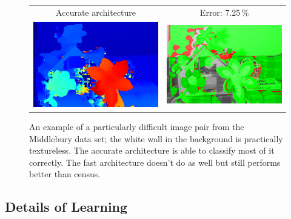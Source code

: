 \documentclass[twoside,11pt]{article}
\begin{document}
\begin{figure}[p]
\begin{center}
\begin{tabular}{cc}
Accurate architecture &
Error: 7.25\,\% \\
\includegraphics[scale=0.5]{img/mb_slow_7_2_pred_.png} &
\includegraphics[scale=0.5]{img/mb_slow_7_2_err_.png}\\
\end{tabular}

\caption{An example of a particularly difficult image pair from the Middlebury
data set; the white wall in the background is practically textureless. The
accurate architecture is able to classify most of it correctly. The fast
architecture doesn't do as well but still performs better than census.}

\label{fig:middlebury}
\end{center}
\end{figure}

\subsection{Details of Learning}
\end{document}
